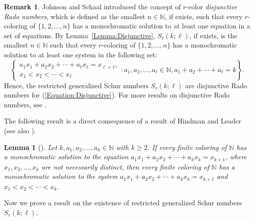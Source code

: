 \documentclass[11pt]{article}
\newtheorem{lemma}[theorem]{Lemma}
\theoremstyle{definition}
\newtheorem{remark}[theorem]{Remark}
\begin{document}
\begin{remark}
Johnson and Schaal \cite{JS2005} introduced the concept of $r$-color \textit{disjunctive Rado numbers}, which is defined as the smallest $n\in\mathbb{N}$, if exists, such that every $r$-coloring of $\{1,2,\ldots,n\}$ has a monochromatic solution to at least one equation in a set of equations. By Lemma~\ref{Lemma:Disjunctive}, $S_r(k;\ell)$, if exists, is the smallest $n\in\mathbb{N}$ such that every $r$-coloring of $\{1,2,\ldots,n\}$ has a monochromatic solution to at least one system in the following set:
\begin{equation}\label{Equation:Disjunctive}
\left\{
\begin{array}{ll}
a_1x_1+a_2x_2+\cdots+a_\ell x_\ell=x_{\ell+1},\\x_1<x_2<\cdots<x_\ell
\end{array}:a_1,a_2,\ldots,a_\ell\in\mathbb{N},a_1+a_2+\cdots+a_\ell=k\right\}.
\end{equation}
Hence, the restricted generalized Schur numbers $S_r(k;\ell)$ are disjunctive Rado numbers for (\ref{Equation:Disjunctive}). For more results on disjunctive Rado numbers, see \cite{DMT2022,DMT2024,DT2025,KS2003}.
\end{remark}

The following result is a direct consequence of a result of Hindman and Leader \cite[Theorem 2]{HL1998} (see also \cite[Theorem 2.2]{GGL2014}).

\begin{lemma}[\cite{HL1998}]\label{Lemma:StronglyRegular}
Let $k,a_1,a_2,\ldots,a_k\in\mathbb{N}$ with $k\geq2$. If every finite coloring of $\mathbb{N}$ has a monochromatic solution to the equation $a_1x_1+a_2x_2+\cdots+a_kx_k=x_{k+1}$, where $x_1,x_2,\ldots,x_k$ are not necessarily distinct, then every finite coloring of $\mathbb{N}$ has a monochromatic solution to the system $a_1x_1+a_2x_2+\cdots+a_kx_k=x_{k+1}$ and $x_1<x_2<\cdots<x_k$.
\end{lemma}

Now we prove a result on the existence of restricted generalized Schur numbers $S_r(k;\ell)$.
\end{document}
